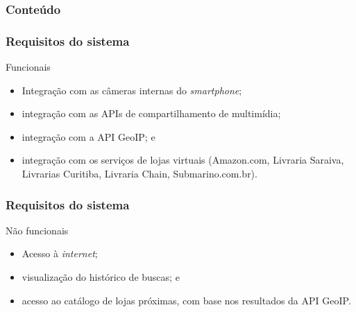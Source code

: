 \documentclass[14pt,beamer]{beamer}
\begin{document}
\begin{frame}
	\frametitle{Conteúdo}
    \begin{multicols}{2}
        \small
    \end{multicols}
\end{frame}

\begin{frame}
	\frametitle{Requisitos do sistema}

    \begin{block}{Funcionais}
        \begin{itemize}
            \item Integração com as câmeras internas do \emph{smartphone};
            \item integração com as APIs de compartilhamento de multimídia;
            \item integração com a API GeoIP; e
            \item integração com os serviços de lojas virtuais (Amazon.com, Livraria
                Saraiva, Livrarias Curitiba, Livraria Chain, Submarino.com.br).
        \end{itemize}
    \end{block}
\end{frame}

\begin{frame}
	\frametitle{Requisitos do sistema}

    \begin{block}{Não funcionais}
        \begin{itemize}
            \item Acesso à \emph{internet};
            \item visualização do histórico de buscas; e
            \item acesso ao catálogo de lojas próximas, com base nos resultados
                da API GeoIP.
        \end{itemize}
    \end{block}
\end{frame}



\end{document}
